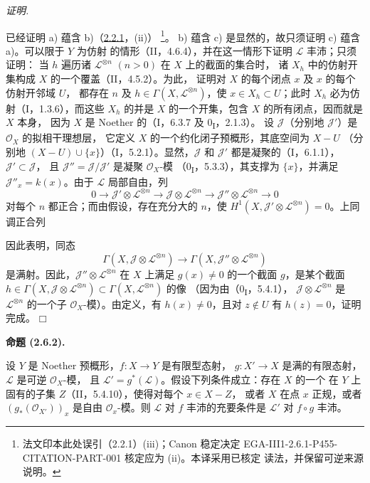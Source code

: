 \documentclass[UTF8,fontset=none,11pt,oneside,openany]{ctexbook}
\providecommand{\square}{\mdlgwhtsquare}
\newcommand{\SourceCorrectionNote}[1]{\footnote{#1}}
\newenvironment{proposition}[1][]{%
  \par\medskip\noindent\textbf{命题 (#1).}\ %
}{\par}
\newenvironment{proof}{%
  \par\smallskip\noindent\textit{证明.}\ %
}{\hfill$\square$\par}
\newcommand{\oldpage}[2][]{%
  \hypertarget{ega-source-page-#1-#2}{}%
  \marginnote{\scriptsize\textbf{#1}~|~#2}\ignorespaces}
\let\EGAOriginalLabel\label
\renewcommand{\label}[1]{\phantomsection\EGAOriginalLabel{#1}}
\begin{document}
\begin{proof}
已经证明 a) 蕴含 b)（\hyperref[III.2.2.1-fr]{2.2.1}，(ii)）
\SourceCorrectionNote{法文印本此处误引（2.2.1）(iii)；Canon 稳定决定
EGA-III1-2.6.1-P455-CITATION-PART-001 核定应为 (ii)。本译采用已核定
读法，并保留可逆来源说明。}。
b) 蕴含 c) 是显然的，故只须证明 c) 蕴含 a)。可以限于 $Y$ 为仿射
的情形（II，4.6.4），并在这一情形下证明 $\mathcal L$ 丰沛；只须证明：
当 $h$ 遍历诸 $\mathcal L^{\otimes n}$ $(n>0)$ 在 $X$ 上的截面的集合时，
诸 $X_h$ 中的仿射开集构成 $X$ 的一个覆盖（II，4.5.2）。为此，
证明对 $X$ 的每个闭点 $x$ 及 $x$ 的每个仿射开邻域 $U$，
都存在 $n$ 及 $h\in\Gamma(X,\mathcal L^{\otimes n})$，使
$x\in X_h\subset U$；此时 $X_h$ 必为仿射（I，1.3.6），而这些 $X_h$
的并是 $X$ 的一个开集，包含 $X$ 的所有闭点，因而就是 $X$ 本身，
因为 $X$ 是 Noether 的（I，6.3.7 及 0\textsubscript{I}，2.1.3）。
设 $\mathcal J$（分别地 $\mathcal J'$）是 $\mathcal O_X$ 的拟相干理想层，
它定义 $X$ 的一个约化闭子预概形，其底空间为 $X-U$
（分别地 $(X-U)\cup\{x\}$）（I，5.2.1）。显然，$\mathcal J$ 和
$\mathcal J'$ 都是凝聚的（I，6.1.1），$\mathcal J'\subset\mathcal J$，
且 $\mathcal J''=\mathcal J/\mathcal J'$ 是凝聚 $\mathcal O_X$-模
（0\textsubscript{I}，5.3.3），其支撑为 $\{x\}$，并满足
$\mathcal J''_x=k(x)$。由于 $\mathcal L$ 局部自由，列
\[
0\to\mathcal J'\otimes\mathcal L^{\otimes n}
\to\mathcal J\otimes\mathcal L^{\otimes n}
\to\mathcal J''\otimes\mathcal L^{\otimes n}\to0
\]
对每个 $n$ 都正合；而由假设，存在充分大的 $n$，使
$H^1(X,\mathcal J'\otimes\mathcal L^{\otimes n})=0$。上同调正合列

\oldpage[III]{112}
因此表明，同态
\[
\Gamma(X,\mathcal J\otimes\mathcal L^{\otimes n})
\longrightarrow
\Gamma(X,\mathcal J''\otimes\mathcal L^{\otimes n})
\]
是满射。因此，$\mathcal J''\otimes\mathcal L^{\otimes n}$ 在 $X$ 上满足
$g(x)\neq0$ 的一个截面 $g$，是某个截面
$h\in\Gamma(X,\mathcal J\otimes\mathcal L^{\otimes n})
\subset\Gamma(X,\mathcal L^{\otimes n})$ 的像
（因为由（0\textsubscript{I}，5.4.1），
$\mathcal J\otimes\mathcal L^{\otimes n}$ 是 $\mathcal L^{\otimes n}$
的一个子 $\mathcal O_X$-模）。由定义，有 $h(x)\neq0$，且对
$z\notin U$ 有 $h(z)=0$，证明完成。
\end{proof}

\begin{proposition}[2.6.2]
\label{III.2.6.2-fr}
设 $Y$ 是 Noether 预概形，$f:X\to Y$ 是有限型态射，
$g:X'\to X$ 是满的有限态射，$\mathcal L$ 是可逆 $\mathcal O_X$-模，
且 $\mathcal L'=g^*(\mathcal L)$。假设下列条件成立：存在 $X$ 的一个
在 $Y$ 上固有的子集 $Z$（II，5.4.10），使得对每个 $x\in X-Z$，
或者 $X$ 在点 $x$ 正规，或者 $(g_*(\mathcal O_{X'}))_x$ 是自由
$\mathcal O_x$-模。则 $\mathcal L$ 对 $f$ 丰沛的充要条件是
$\mathcal L'$ 对 $f\circ g$ 丰沛。
\end{proposition}
\end{document}
